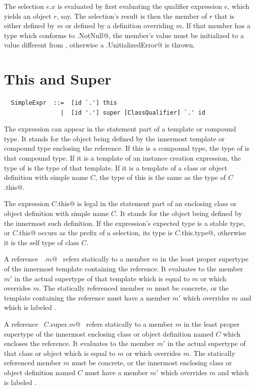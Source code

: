 The selection $e.x$ is evaluated by first evaluating the qualifier
expression $e$, which yields an object $r$, say. The selection's
result is then the member of $r$ that is either defined by $m$ or defined
by a definition overriding $m$. If that member has a type which
conforms to \@scala.NotNull@, the member's value must be initialized
to a value different from \@null@, otherwise a \@scala.UnitializedError@
is thrown.
 

\section{This and Super}
\label{sec:this-super}

\syntax\begin{lstlisting}
  SimpleExpr  ::=  [id `.'] this
                |  [id '.'] super [ClassQualifier] `.' id
\end{lstlisting}

The expression  can appear in the statement part of a
template or compound type. It stands for the object being defined by
the innermost template or compound type enclosing the reference. If
this is a compound type, the type of  is that compound type.
If it is a template of an instance creation expression, the type of
 is the type of that template. If it is a template of a
class or object definition with simple name $C$, the type of this
is the same as the type of \lstinline@$C$.this@.

The expression \lstinline@$C$.this@ is legal in the statement part of an
enclosing class or object definition with simple name $C$. It
stands for the object being defined by the innermost such definition.
If the expression's expected type is a stable type, or
\lstinline@$C$.this@ occurs as the prefix of a selection, its type is
\lstinline@$C$.this.type@, otherwise it is the self type of class $C$.

A reference ~\lstinline@super.$m$@~ refers statically to a member $m$
in the least proper supertype of the innermost template containing the
reference.  It evaluates to the member $m'$ in the actual supertype of
that template which is equal to $m$ or which overrides $m$.  The
statically referenced member $m$ must be concrete, or the template
containing the reference must have a member $m'$ which overrides $m$
and which is labeled .  

A reference ~\lstinline@$C$.super.$m$@~ refers statically to a member
$m$ in the least proper supertype of the innermost enclosing class or
object definition named $C$ which encloses the reference. It evaluates
to the member $m'$ in the actual supertype of that class or object
which is equal to $m$ or which overrides $m$.  The statically
referenced member $m$ must be concrete, or the innermost enclosing
class or object definition named $C$ must have a member $m'$ which
overrides $m$ and which is labeled .

